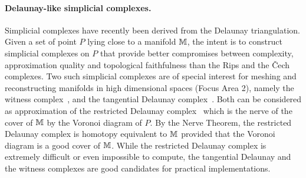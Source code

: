 \paragraph{Delaunay-like  simplicial complexes.} 
Simplicial complexes have recently been derived from the Delaunay triangulation. Given a set of point $P$ lying close to a manifold $\mathbb M$, the intent is to construct simplicial complexes on $P$ that provide better compromises between complexity, approximation quality and topological faithfulness than the Rips and the \v{C}ech complexes.  Two such simplicial complexes are of special interest for meshing and reconstructing manifolds in high dimensional spaces (Focus Area 2), namely
 the witness
complex~\cite{cds-tewc-2004}, and the tangential Delaunay
complex~\cite{geometrica-7142i}.
Both can be considered as approximation of the restricted Delaunay complex~\cite{} which is the nerve of the cover of $\mathbb M$ by the Voronoi diagram of $P$. By the Nerve Theorem, the restricted Delaunay complex is homotopy equivalent to $\mathbb M$ provided that the Voronoi diagram is a good cover of $\mathbb M$.  While the restricted Delaunay complex is extremely difficult or even impossible to compute, the tangential Delaunay and the witness complexes are good candidates for practical implementations. %

